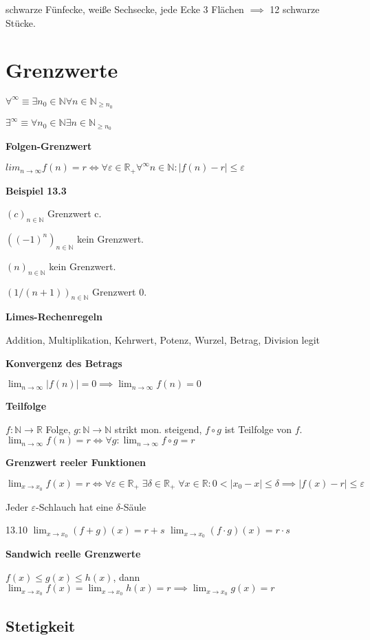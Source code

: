 \documentclass[a4paper,10pt]{article}
\newcommand{\N}{\mathbb{N}}
\newcommand{\natnum}{\mathbb{N}}
\newcommand{\R}{\mathbb{R}}
\newcommand{\realnum}{\mathbb{R}}
\renewcommand{\epsilon}{\varepsilon}
\begin{document}
\begin{multicols}{3}
schwarze Fünfecke, weiße Sechsecke, jede Ecke 3 Flächen $\implies$ 12 schwarze Stücke.

\section{Grenzwerte}

$\forall^\infty \equiv \exists n_0 \in \natnum \forall n \in \natnum_{\geq n_0}$

$\exists^\infty \equiv \forall n_0 \in \natnum \exists n \in \natnum_{\geq n_0}$

\textbf{Folgen-Grenzwert}

$lim_{n\to\infty} f(n) = r \iff \forall \varepsilon \in \realnum_+ \forall^\infty n \in \natnum: |f(n) - r| \leq \varepsilon$

\textbf{Beispiel 13.3}

$(c)_{n\in \natnum}$ Grenzwert c.

$((-1)^n)_{n \in \natnum}$ kein Grenzwert.

$(n)_{n \in \natnum}$ kein Grenzwert.

$(1/(n+1))_{n \in \natnum}$ Grenzwert 0.

\textbf{Limes-Rechenregeln}

Addition, Multiplikation, Kehrwert, Potenz, Wurzel, Betrag, Division legit

\textbf{Konvergenz des Betrags}

$\lim_{n\to\infty} |f(n)|=0 \implies \lim_{n\to\infty} f(n)=0$

\textbf{Teilfolge}

$f:\N\to\R$ Folge, $g:\N\to\N$ strikt mon. steigend, $f\circ g$ ist Teilfolge von $f$. $\lim_{n\to\infty}f(n)=r \iff \forall g: \lim_{n\to\infty} f\circ g = r$

\textbf{Grenzwert reeler Funktionen}

$\lim_{x\to x_0}f(x) = r \iff \forall \epsilon\in\R_+\; \exists \delta\in\R_+\; \forall x\in\R: 0 < |x_0-x| \le \delta \implies |f(x)-r| \le \epsilon$

Jeder $\epsilon$-Schlauch hat eine $\delta$-Säule

13.10 $\lim_{x \rightarrow x_0} (f+g)(x) = r+s$
$\lim_{x \rightarrow x_0} (f \cdot g)(x) = r \cdot s$

\textbf{Sandwich reelle Grenzwerte}

$f(x) \leq g(x) \leq h(x)$, dann $\lim_{x \rightarrow x_0} f(x) = \lim_{x \rightarrow x_0} h(x)=r \implies \lim_{x \rightarrow x_0} g(x)=r$

\subsection{Stetigkeit}


\end{multicols}
\end{document}
